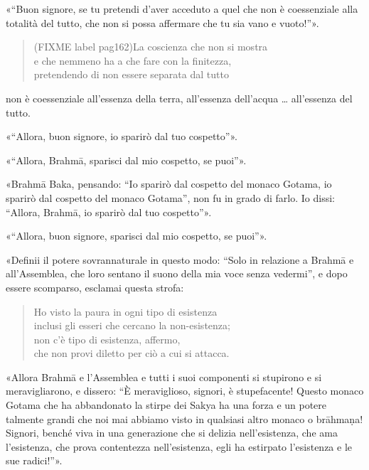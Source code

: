 «“Buon signore, se tu pretendi d’aver acceduto a quel che non è
coessenziale alla totalità del tutto, che non si possa affermare che tu
sia vano e vuoto!”».


\begin{quote}
(FIXME label pag162)La coscienza che non si mostra \\
e che nemmeno ha a che fare con la finitezza, \\
pretendendo di non essere separata dal tutto
\end{quote}

non è coessenziale all’essenza della terra, all’essenza dell’acqua …
all’essenza del tutto.


«“Allora, buon signore, io sparirò dal tuo cospetto”».


«“Allora, Brahmā, sparisci dal mio cospetto, se puoi”».


«Brahmā Baka, pensando: “Io sparirò dal cospetto del monaco Gotama, io
sparirò dal cospetto del monaco Gotama”, non fu in grado di farlo. Io
dissi: “Allora, Brahmā, io sparirò dal tuo cospetto”».


«“Allora, buon signore, sparisci dal mio cospetto, se puoi”».


«Definii il potere sovrannaturale in questo modo: “Solo in relazione a
Brahmā e all’Assemblea, che loro sentano il suono della mia voce senza
vedermi”, e dopo essere scomparso, esclamai questa strofa:


\begin{quote}
Ho visto la paura in ogni tipo di esistenza \\
inclusi gli esseri che cercano la non-esistenza; \\
non c’è tipo di esistenza, affermo, \\
che non provi diletto per ciò a cui si attacca.
\end{quote}

«Allora Brahmā e l’Assemblea e tutti i suoi componenti si stupirono e si
meravigliarono, e dissero: “È meraviglioso, signori, è stupefacente!
Questo monaco Gotama che ha abbandonato la stirpe dei Sakya ha una forza
e un potere talmente grandi che noi mai abbiamo visto in qualsiasi altro
monaco o brāhmaṇa! Signori, benché viva in una generazione che si
delizia nell’esistenza, che ama l’esistenza, che prova contentezza
nell’esistenza, egli ha estirpato l’esistenza e le sue radici!”».


